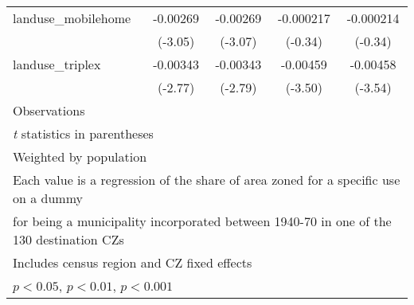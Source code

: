 \begin{table}[htbp]
\begin{tabular}{l*{4}{c}}
\addlinespace
landuse\_mobilehome  &    -0.00269\sym{**} &    -0.00269\sym{**} &   -0.000217         &   -0.000214         \\
                    &     (-3.05)         &     (-3.07)         &     (-0.34)         &     (-0.34)         \\
\addlinespace
landuse\_triplex     &    -0.00343\sym{**} &    -0.00343\sym{**} &    -0.00459\sym{***}&    -0.00458\sym{***}\\
                    &     (-2.77)         &     (-2.79)         &     (-3.50)         &     (-3.54)         \\
\midrule
Observations        &                     &                     &                     &                     \\
\bottomrule
\multicolumn{5}{l}{\footnotesize \textit{t} statistics in parentheses}\\
\multicolumn{5}{l}{\footnotesize Weighted by population}\\
\multicolumn{5}{l}{\footnotesize Each value is a regression of the share of area zoned for a specific use on a dummy}\\
\multicolumn{5}{l}{\footnotesize for being a municipality incorporated between 1940-70 in one of the 130 destination CZs}\\
\multicolumn{5}{l}{\footnotesize Includes census region and CZ fixed effects}\\
\multicolumn{5}{l}{\footnotesize \sym{*} \(p<0.05\), \sym{**} \(p<0.01\), \sym{***} \(p<0.001\)}\\
\end{tabular}
\end{table}
